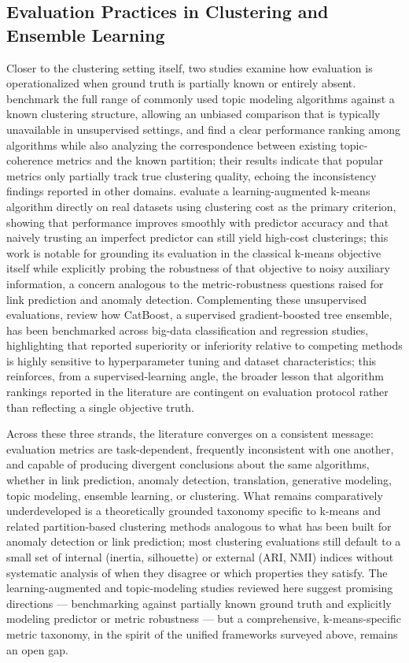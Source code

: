 \subsection{Evaluation Practices in Clustering and Ensemble Learning}
Closer to the clustering setting itself, two studies examine how evaluation is operationalized when ground truth is partially known or entirely absent. \cite{rudiger2022topic} benchmark the full range of commonly used topic modeling algorithms against a known clustering structure, allowing an unbiased comparison that is typically unavailable in unsupervised settings, and find a clear performance ranking among algorithms while also analyzing the correspondence between existing topic-coherence metrics and the known partition; their results indicate that popular metrics only partially track true clustering quality, echoing the inconsistency findings reported in other domains. \cite{ergun2021learning} evaluate a learning-augmented k-means algorithm directly on real datasets using clustering cost as the primary criterion, showing that performance improves smoothly with predictor accuracy and that naively trusting an imperfect predictor can still yield high-cost clusterings; this work is notable for grounding its evaluation in the classical k-means objective itself while explicitly probing the robustness of that objective to noisy auxiliary information, a concern analogous to the metric-robustness questions raised for link prediction and anomaly detection. Complementing these unsupervised evaluations, \cite{hancock2020catboost} review how CatBoost, a supervised gradient-boosted tree ensemble, has been benchmarked across big-data classification and regression studies, highlighting that reported superiority or inferiority relative to competing methods is highly sensitive to hyperparameter tuning and dataset characteristics; this reinforces, from a supervised-learning angle, the broader lesson that algorithm rankings reported in the literature are contingent on evaluation protocol rather than reflecting a single objective truth.

Across these three strands, the literature converges on a consistent message: evaluation metrics are task-dependent, frequently inconsistent with one another, and capable of producing divergent conclusions about the same algorithms, whether in link prediction, anomaly detection, translation, generative modeling, topic modeling, ensemble learning, or clustering. What remains comparatively underdeveloped is a theoretically grounded taxonomy specific to k-means and related partition-based clustering methods analogous to what has been built for anomaly detection or link prediction; most clustering evaluations still default to a small set of internal (inertia, silhouette) or external (ARI, NMI) indices without systematic analysis of when they disagree or which properties they satisfy. The learning-augmented and topic-modeling studies reviewed here suggest promising directions --- benchmarking against partially known ground truth and explicitly modeling predictor or metric robustness --- but a comprehensive, k-means-specific metric taxonomy, in the spirit of the unified frameworks surveyed above, remains an open gap.

